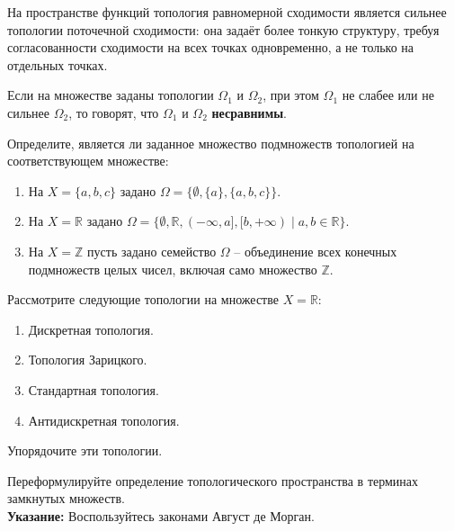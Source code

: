 \begin{example}
	На пространстве функций топология равномерной сходимости является сильнее топологии поточечной сходимости: она задаёт более тонкую структуру, требуя согласованности сходимости на всех точках одновременно, а не только на отдельных точках. 
\end{example}

\begin{definition}
	Если на множестве заданы топологии \(\Omega_1\) и \(\Omega_2\), при этом \(\Omega_1\) не слабее или не сильнее \(\Omega_2\), то говорят, что \(\Omega_1\) и \(\Omega_2\) \textbf{несравнимы}.
\end{definition}


\begin{task}
	Определите, является ли заданное множество подмножеств топологией на соответствующем множестве:  
\begin{enumerate}
    \item На $X = \{a, b, c\}$ задано $\Omega = \{\emptyset, \{a\}, \{a, b, c\}\}$.  
    \item На $X = \mathbb{R}$ задано $\Omega = \{\emptyset, \mathbb{R}, (-\infty, a], [b, +\infty) \mid a, b \in \mathbb{R}\}$.  
    \item На $X = \mathbb{Z}$ пусть задано семейство $\Omega$ -- объединение всех конечных подмножеств целых чисел, включая само множество $\mathbb{Z}$.  
\end{enumerate}  
\end{task}

\begin{task}
	Рассмотрите следующие топологии на множестве $X = \mathbb{R}$:  
	\begin{enumerate}
		\item Дискретная топология.  
		\item Топология Зарицкого.  
		\item Стандартная топология.  
		\item Антидискретная топология.
	\end{enumerate}
	Упорядочите эти топологии.
\end{task}
	

\begin{task}
	Переформулируйте определение топологического пространства в терминах замкнутых множеств.  \\ 
	\textbf{Указание:} Воспользуйтесь законами Август де Морган.
\end{task}


